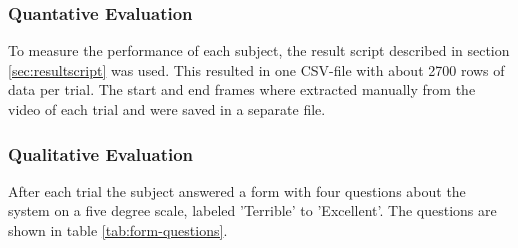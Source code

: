 \documentclass[nofilelist]{cslthse-msc}
\begin{document}
\subsubsection{Quantative Evaluation}
To measure the performance of each subject, the result script described in section \ref{sec:resultscript} was used. This resulted in one CSV-file with about 2700 rows of data per trial. The start and end frames where extracted manually from the video of each trial and were saved in a separate file.  

\subsubsection{Qualitative Evaluation}
After each trial the subject answered a form with four questions about the system on a five degree scale, labeled 'Terrible' to 'Excellent'. The questions are shown in table \ref{tab:form-questions}. 

\setlength{\extrarowheight}{5pt}
\vspace{10pt}
\end{document}
